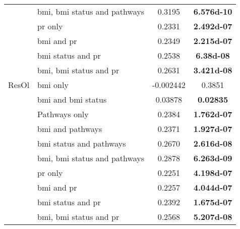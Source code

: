 \begin{ThreePartTable}
\begin{longtable}{llcc}
                                          & \gls{bmi}, \gls{bmi} status and pathways & 0.3195     & \bfseries \num{6.576d-10}           \\
                                          & \gls{pr} only                            & 0.2331     & \bfseries \num{2.492d-07}           \\
                                          & \gls{bmi} and \gls{pr}                   & 0.2349     & \bfseries \num{2.215d-07}           \\
                                          & \gls{bmi} status and \gls{pr}            & 0.2538     & \bfseries \num{6.38d-08}            \\
                                          & \gls{bmi}, \gls{bmi} status and \gls{pr} & 0.2631     & \bfseries \num{3.421d-08}           \\
				\hline
				\rule{0pt}{2.25ex}ResOl   & \gls{bmi} only                           & -0.002442  & 0.3851                              \\
                                          & \gls{bmi} and \gls{bmi} status           & 0.03878    & \bfseries 0.02835                   \\
                                          & Pathways only                            & 0.2384     & \bfseries \num{1.762d-07}           \\
                                          & \gls{bmi} and pathways                   & 0.2371     & \bfseries \num{1.927d-07}           \\
                                          & \gls{bmi} status and pathways            & 0.2670     & \bfseries \num{2.616d-08}           \\
                                          & \gls{bmi}, \gls{bmi} status and pathways & 0.2878     & \bfseries \num{6.263d-09}           \\
                                          & \gls{pr} only                            & 0.2251     & \bfseries \num{4.198d-07}           \\
                                          & \gls{bmi} and \gls{pr}                   & 0.2257     & \bfseries \num{4.044d-07}           \\
                                          & \gls{bmi} status and \gls{pr}            & 0.2392     & \bfseries \num{1.675d-07}           \\
                                          & \gls{bmi}, \gls{bmi} status and \gls{pr} & 0.2568     & \bfseries \num{5.207d-08}           \\

\end{longtable}
\end{ThreePartTable}
